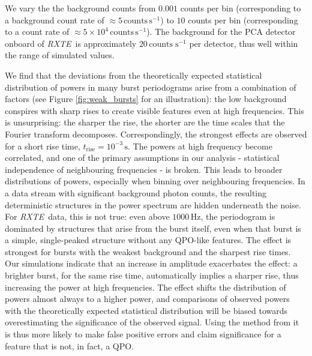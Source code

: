 \documentclass[numberedappendix]{emulateapj}
\newcommand{\hz}{\,\mathrm{Hz}}
\newcommand{\project}[1]{\textsl{#1}}
\newcommand{\rxte}{\project{RXTE}}
\begin{document}
We vary the the background counts from $0.001$ counts per bin (corresponding to a background count rate of $\approx 5 \, \mathrm{counts}\, \mathrm{s}^{-1}$) to $10$ counts per bin (corresponding to a count rate of $\approx 5 \times 10^{4}\, \mathrm{counts}\, \mathrm{s}^{-1}$). The background for the PCA detector onboard of \rxte\ is approximately $20\, \mathrm{counts}\; \mathrm{s}^{-1}$ per detector, thus well within the range of simulated values.


We find that the deviations from the theoretically expected statistical distribution of powers in many burst periodograms arise from a combination of factors (see Figure \ref{fig:weak_bursts} for an illustration): the low background conspires with sharp rises to create visible features even at high frequencies. This is unsurprising: the sharper the rise, the shorter are the time scales that the Fourier transform decomposes. Correspondingly, the strongest effects are observed for a short rise time, $t_{\mathrm{rise}} = 10^{-3}\,\mathrm{s}$. The powers at high frequency become correlated, and one of the primary assumptions in our analysis - statistical independence of neighbouring frequencies - is broken. This leads to broader distributions of powers, especially when binning over neighbouring frequencies. In a data stream with significant background photon counts, the resulting deterministic structures in the power spectrum are hidden underneath the noise. For \rxte\ data, this is not true: even above $1000\hz$, the periodogram is dominated by structures that arise from the burst itself, even when that burst is a simple, single-peaked structure without any QPO-like features. The effect is strongest for bursts with the weakest background and the sharpest rise times. Our simulations indicate that an increase in amplitude exacerbates the effect: a brighter burst, for the same rise time, automatically implies a sharper rise, thus increasing the power at high frequencies. The effect shifts the distribution of powers almost always to a higher power, and comparisons of observed powers with the theoretically expected statistical distribution will be biased towards overestimating the significance of the observed signal. Using the method from \citet{huppenkothen2013} it is thus more likely to make false positive errors and claim significance for a feature that is not, in fact, a QPO.
\end{document}
